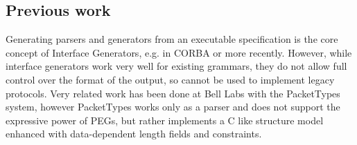 \subsection{Previous work}
Generating parsers and generators from an executable specification is the core concept of Interface
Generators, e.g. in CORBA or more recently\cite{varda2008}. However, while interface
generators work very well for existing grammars, they do not allow full control over the format of
the output, so cannot be used to implement legacy protocols.
Very related work has been done at Bell Labs with the PacketTypes system\cite{mccann2000packet},
however PacketTypes works only as a parser and does not support the expressive power of PEGs, but rather
implements a C like structure model enhanced with data-dependent length fields and constraints.
\begin{comment}

Memory corruption exploits (frequently) rely on placing controlled values at known (or controlled)
memory locations. Exploit countermeasures  like Address-Space Layout Randomisation\cite{pax-aslr},
 heap cookies \cite{heapcookies} or data execution prevention try to make this harder for
 an attacker. Attackers have developed techniques such as heap spraying \cite{heapspray} and heap
 feng shui\cite{fengshui} to help bypass those mitigations. 


Nail parsers use two arena allocators\cite{arena}, one for the temporary syntax tree and one for the
result. If Nail were to use the normal system allocator, the attacker could cause two packets to be
parsed at the same time (or, given a sufficiently complicated input, two structure within the same
grammar to be parsed sequentially) such that the (invalid) intermediate results from one parse,  
 If there is a buffer overflow past the
end of one input, it is much harder for the attacker craft a sequence of packets to trick the allocator into
placing a known value next to that input.

\end{comment}
